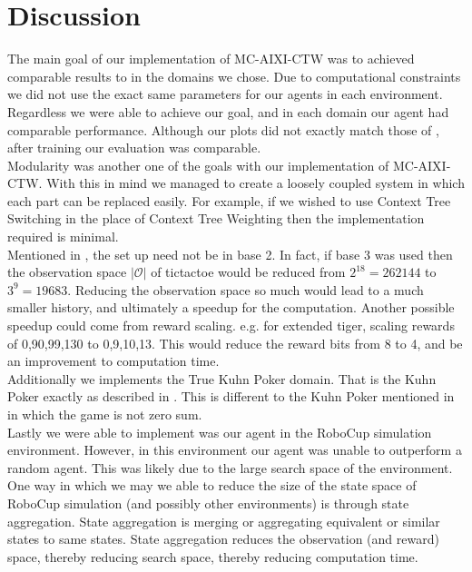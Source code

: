 \documentclass{article}
\theoremstyle{definition}
\newtheorem{primary statistics}[definition]{Primary Statistics}
\newtheorem{auxiliary statistics}[definition]{Auxiliary Statistics}
\begin{document}
\newpage

\section{Discussion}


The main goal of our implementation of MC-AIXI-CTW was to achieved comparable results to \citep{veness2011monte} in the domains we chose. Due to computational constraints we did not use the exact same parameters for our agents in each environment. Regardless we were able to achieve our goal, and in each domain our agent had comparable performance. Although our plots did not exactly match those of \citep{veness2011monte}, after training our evaluation was comparable. \\

Modularity was another one of the goals with our implementation of MC-AIXI-CTW. With this in mind we managed to create a loosely coupled system in which each part can be replaced easily. For example, if we wished to use Context Tree Switching \citep{veness2012context} in the place of Context Tree Weighting then the implementation required is minimal. \\

Mentioned in \citep{veness2011monte}, the set up need not be in base 2. In fact, if base 3 was used then the observation space $|\mathcal{O}|$ of tictactoe would be reduced from $2^{18}=262144$ to $3^9 = 19683$. Reducing the observation space so much would lead to a much smaller history, and ultimately a speedup for the computation. Another possible speedup could come from reward scaling.  e.g. for extended tiger, scaling rewards of 0,90,99,130 to 0,9,10,13. This would reduce the reward bits from 8 to 4, and be an improvement to computation time. \\

Additionally we implements the True Kuhn Poker domain. That is the Kuhn Poker exactly as described in \citep{kuhn1950simplified}. This is different to the Kuhn Poker mentioned in  \citep{veness2011monte} in which the game is not zero sum. \\

Lastly we were able to implement was our agent in the RoboCup simulation environment. However, in this environment our agent was unable to outperform a random agent. This was likely due to the large search space of the environment. One way in which we may we able to reduce the size of the state space of RoboCup simulation (and possibly other environments) is through state aggregation. State aggregation is merging or aggregating equivalent or similar states to same states. State aggregation reduces the observation (and reward) space, thereby reducing search space, thereby reducing computation time.
\end{document}
